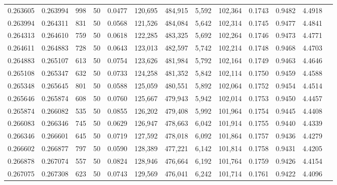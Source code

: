 \begin{tabular}{rrrrrrrrrrrrr}
0.263605 & 0.263994 &   998 &  50 &                                     0.0477 & 120,695 & 484,915 &   5,592 & 102,364 & 0.1743 & 0.9482 & 4.4918 \\
0.263994 & 0.264311 &   831 &  50 &                                     0.0568 & 121,526 & 484,084 &   5,642 & 102,314 & 0.1745 & 0.9477 & 4.4841 \\
0.264313 & 0.264610 &   759 &  50 &                                     0.0618 & 122,285 & 483,325 &   5,692 & 102,264 & 0.1746 & 0.9473 & 4.4771 \\
0.264611 & 0.264883 &   728 &  50 &                                     0.0643 & 123,013 & 482,597 &   5,742 & 102,214 & 0.1748 & 0.9468 & 4.4703 \\
0.264883 & 0.265107 &   613 &  50 &                                     0.0754 & 123,626 & 481,984 &   5,792 & 102,164 & 0.1749 & 0.9463 & 4.4646 \\
0.265108 & 0.265347 &   632 &  50 &                                     0.0733 & 124,258 & 481,352 &   5,842 & 102,114 & 0.1750 & 0.9459 & 4.4588 \\
0.265348 & 0.265645 &   801 &  50 &                                     0.0588 & 125,059 & 480,551 &   5,892 & 102,064 & 0.1752 & 0.9454 & 4.4514 \\
0.265646 & 0.265874 &   608 &  50 &                                     0.0760 & 125,667 & 479,943 &   5,942 & 102,014 & 0.1753 & 0.9450 & 4.4457 \\
0.265874 & 0.266082 &   535 &  50 &                                     0.0855 & 126,202 & 479,408 &   5,992 & 101,964 & 0.1754 & 0.9445 & 4.4408 \\
0.266083 & 0.266346 &   745 &  50 &                                     0.0629 & 126,947 & 478,663 &   6,042 & 101,914 & 0.1755 & 0.9440 & 4.4339 \\
0.266346 & 0.266601 &   645 &  50 &                                     0.0719 & 127,592 & 478,018 &   6,092 & 101,864 & 0.1757 & 0.9436 & 4.4279 \\
0.266602 & 0.266877 &   797 &  50 &                                     0.0590 & 128,389 & 477,221 &   6,142 & 101,814 & 0.1758 & 0.9431 & 4.4205 \\
0.266878 & 0.267074 &   557 &  50 &                                     0.0824 & 128,946 & 476,664 &   6,192 & 101,764 & 0.1759 & 0.9426 & 4.4154 \\
0.267075 & 0.267308 &   623 &  50 &                                     0.0743 & 129,569 & 476,041 &   6,242 & 101,714 & 0.1761 & 0.9422 & 4.4096 \\

\end{tabular}
